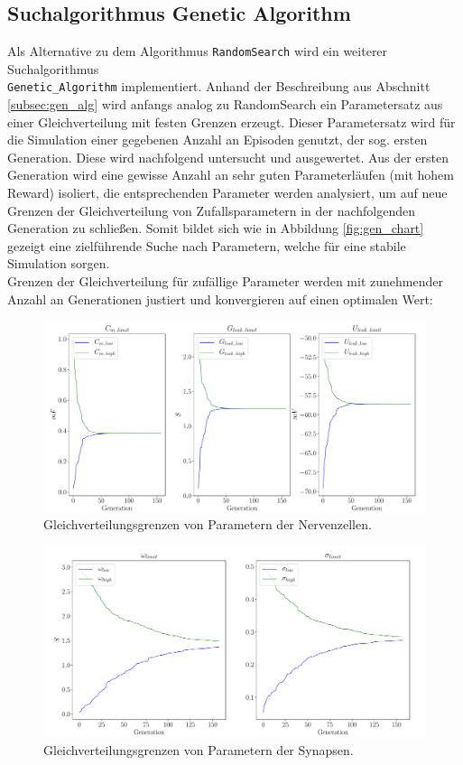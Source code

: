 	\subsection{Suchalgorithmus Genetic Algorithm}
		\enlargethispage{2\baselineskip}
		Als Alternative zu dem Algorithmus \texttt{RandomSearch} wird ein weiterer Suchalgorithmus\\ \texttt{Genetic\_Algorithm} implementiert. Anhand der Beschreibung aus Abschnitt \ref{subsec:gen_alg} wird anfangs analog zu RandomSearch ein Parametersatz aus einer Gleichverteilung mit festen Grenzen erzeugt. Dieser Parametersatz wird für die Simulation einer gegebenen Anzahl an Episoden genutzt, der sog. ersten Generation. Diese wird nachfolgend untersucht und ausgewertet. Aus der ersten Generation wird eine gewisse Anzahl an sehr guten Parameterläufen (mit hohem Reward) isoliert, die entsprechenden Parameter werden analysiert, um auf neue Grenzen der Gleichverteilung von Zufallsparametern in der nachfolgenden Generation zu schließen. Somit bildet sich wie in Abbildung \ref{fig:gen_chart} gezeigt eine zielführende Suche nach Parametern, welche für eine stabile Simulation sorgen.\\
		Grenzen der Gleichverteilung für zufällige Parameter werden mit zunehmender Anzahl an Generationen justiert und konvergieren auf einen optimalen Wert:
		\begin{figure}[H]
			\centering
			\includegraphics[width=13cm]{figures/chap_implement/ga_neuron.pdf}
			\caption{Gleichverteilungsgrenzen von Parametern der Nervenzellen.}
			\label{fig:ga_1}
		\end{figure}
		\begin{figure}[h]
			\centering
			\includegraphics[width=13cm]{figures/chap_implement/ga_synapse.pdf}
			\caption{Gleichverteilungsgrenzen von Parametern der Synapsen.}
			\label{fig:ga_2}
		\end{figure}
	
